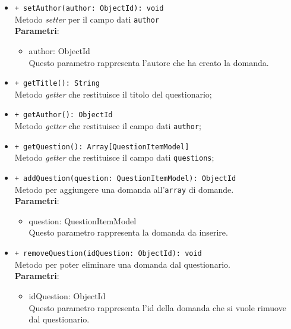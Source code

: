 \begin{itemize}
\begin{itemize}
				\item \texttt{+ setAuthor(author: ObjectId): void} \\
				Metodo \textit{setter} per il campo dati \texttt{author}\\
				\textbf{Parametri}:
				\begin{itemize}
					\item {author: ObjectId}\\
					Questo parametro rappresenta l'autore che ha creato la domanda.
				\end{itemize}
				
				\item \texttt{+ getTitle(): String} \\
				Metodo \textit{getter} che restituisce il titolo del questionario;
				
				\item \texttt{+ getAuthor(): ObjectId} \\
				Metodo \textit{getter} che restituisce il campo dati \texttt{author};
				
				\item \texttt{+ getQuestion(): Array[QuestionItemModel]} \\
				Metodo \textit{getter} che restituisce il campo dati \texttt{questions};
				
				\item \texttt{+ addQuestion(question: QuestionItemModel): ObjectId} \\
				Metodo per aggiungere una domanda all'\texttt{array} di domande.\\
				\textbf{Parametri}:
				\begin{itemize}
					\item {question: QuestionItemModel}\\
					Questo parametro rappresenta la domanda da inserire.
				\end{itemize}
				
				\item \texttt{+ removeQuestion(idQuestion: ObjectId): void} \\
				Metodo per poter eliminare una domanda dal questionario.\\
				\textbf{Parametri}:
				\begin{itemize}
					\item {idQuestion: ObjectId}\\
					Questo parametro rappresenta l'id della domanda che si vuole rimuove dal questionario.
				\end{itemize}
				
				
			\end{itemize}
		\end{itemize}	
		
		